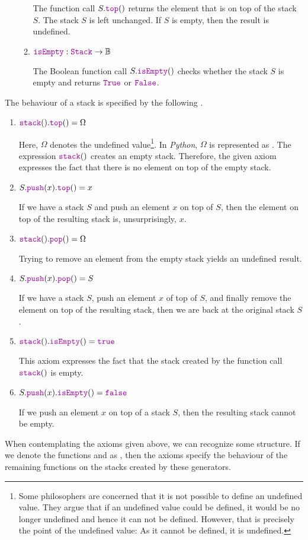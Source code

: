 \begin{enumerate}
\begin{enumerate}
            The function call $S.\mytt{top}()$ returns the element that is on top of the stack $S$. 
            The stack $S$ is left unchanged.  If $S$ is empty, then the result is undefined.
     \item $\mytt{isEmpty}: \mytt{Stack} \rightarrow \mathbb{B}$

           The Boolean function call $S.\mytt{isEmpty}()$ checks whether the stack $S$ is empty
           and returns $\mytt{True}$ or $\mytt{False}$.
      \end{enumerate}
\end{enumerate}
The behaviour of a stack is specified by the following .
\begin{enumerate}
\item $\mytt{stack}().\mytt{top}() = \Omega$

      Here, $\Omega$ \index{$\Omega$} denotes the undefined value\footnote{
       Some philosophers are concerned that it is not possible to define an undefined value.
       They argue that if an undefined value could be defined, it would be no longer undefined
       and hence it can not be defined.  However, that is precisely the point of the undefined 
       value: As it cannot be defined, it is undefined. }.
        
      In \textsl{Python}, $\Omega$ is represented as . The expression $\mytt{stack}()$
      creates an empty stack.  Therefore, the given axiom expresses the fact that there is no
      element on top of the empty stack.
\item $S.\mytt{push}(x).\mytt{top}() = x$

      If we have a stack $S$ and push an element $x$ on top of $S$, then the element on top
      of the resulting stack is, unsurprisingly, $x$.
\item $\mytt{stack}().\mytt{pop}() = \Omega$

      Trying to remove an element from the empty stack yields an undefined result.
\item $S.\mytt{push}(x).\mytt{pop}() = S$

      If we have a stack $S$, push an element $x$ of top of $S$, and finally remove the element
      on top of the resulting stack, then we are back at the original stack $S$.
    
\item $\mytt{stack}().\mytt{isEmpty}() = \mytt{true}$

      This axiom expresses the fact that the stack created by the function call $\mytt{stack}()$
      is empty.
\item $S.\mytt{push}(x).\mytt{isEmpty}() = \mytt{false}$

      If we push an element $x$ on top of a stack $S$, then the resulting stack cannot be empty.
\end{enumerate}
When contemplating the axioms given above, we can recognize some structure.  If we denote the
functions  and  as ,  then the axioms specify the
behaviour of the remaining functions on the stacks created by these generators.

